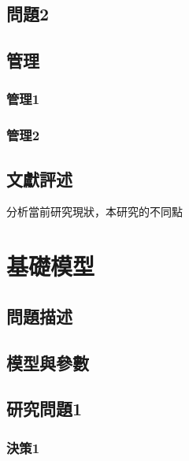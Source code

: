 \documentclass[14pt, a4paper,openany]{ctexbook} %
\renewcommand\thechapter{第\chinese{chapter}章}  %
\renewcommand{\chaptername}{{\thechapter}}
\numberwithin{figure}{chapter}
\numberwithin{table}{chapter}
\begin{document}
\section{問題2}







\section{管理}



\subsection{管理1}





\subsection{管理2}





\section{文獻評述}
分析當前研究現狀，本研究的不同點


\newpage
\chapter{基礎模型}
\renewcommand{\chaptername}{第\chinese{chapter}章~~基礎模型}
\section{問題描述}


\section{模型與參數}





\section{研究問題1}

\subsection{決策1}
\end{document}
